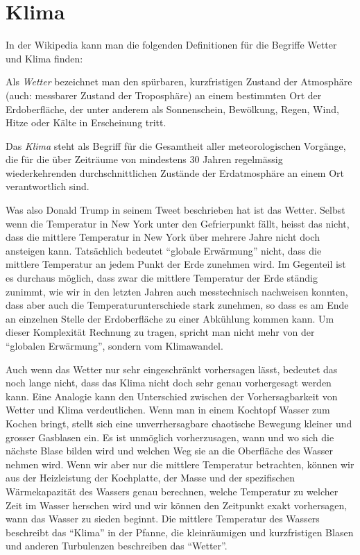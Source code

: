 %
%
%

\section{Klima\label{section:klima}}
In der Wikipedia kann man die folgenden Definitionen für die Begriffe Wetter
und Klima finden:

\begin{definition}
Als {\em Wetter} bezeichnet man den
spürbaren, kurzfristigen Zustand der Atmosphäre (auch: messbarer
Zustand der Troposphäre) an einem bestimmten Ort der Erdoberfläche,
der unter anderem als Sonnenschein, Bewölkung, Regen, Wind, Hitze
oder Kälte in Erscheinung tritt.
\cite{skript:wetter}
\end{definition}

\begin{definition}
Das {\em Klima} steht als Begriff für die Gesamtheit aller meteorologischen
Vorgänge, die für die über Zeiträume von mindestens 30 Jahren
regelmässig wiederkehrenden durchschnittlichen Zustände der Erdatmosphäre
an einem Ort verantwortlich sind.
\cite{skript:klima}
\end{definition}

Was also Donald Trump in seinem Tweet beschrieben hat ist das Wetter.
Selbst wenn die Temperatur in New York unter den Gefrierpunkt fällt, 
heisst das nicht, dass die mittlere Temperatur in New York über mehrere
Jahre nicht doch ansteigen kann.
Tatsächlich bedeutet ``globale Erwärmung'' nicht, dass die mittlere
Temperatur an jedem Punkt der Erde zunehmen wird.
Im Gegenteil ist es durchaus möglich, dass zwar die mittlere Temperatur
der Erde ständig zunimmt, wie wir in den letzten Jahren auch messtechnisch
nachweisen konnten, dass aber auch die Temperaturunterschiede stark zunehmen,
so dass es am Ende an einzelnen Stelle der Erdoberfläche zu einer 
Abkühlung kommen kann.
Um dieser Komplexität Rechnung zu tragen, spricht man nicht mehr von
der ``globalen Erwärmung'', sondern vom Klimawandel.

Auch wenn das Wetter nur sehr eingeschränkt vorhersagen lässt,
bedeutet das noch lange nicht, dass das Klima nicht doch sehr
genau vorhergesagt werden kann.
Eine Analogie kann den Unterschied zwischen der Vorhersagbarkeit
von Wetter und Klima verdeutlichen.
Wenn man in einem Kochtopf Wasser zum Kochen bringt, stellt sich
eine unverrhersagbare chaotische Bewegung kleiner und grosser
Gasblasen ein.
Es ist unmöglich vorherzusagen, wann und wo sich die nächste Blase
bilden wird und welchen Weg sie an die Oberfläche des Wasser nehmen
wird.
Wenn wir aber nur die mittlere Temperatur betrachten, können wir
aus der Heizleistung der Kochplatte, der Masse und der spezifischen
Wärmekapazität des Wassers genau berechnen, welche Temperatur zu welcher
Zeit im Wasser herschen wird und wir können den Zeitpunkt exakt
vorhersagen, wann das Wasser zu sieden beginnt.
Die mittlere Temperatur des Wassers beschreibt das ``Klima''
in der Pfanne, die kleinräumigen und kurzfristigen Blasen und anderen
Turbulenzen beschreiben das ``Wetter''.

